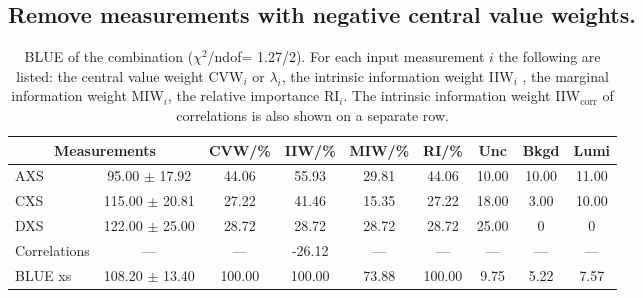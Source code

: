 \subsection{Remove measurements with negative central value weights.}
\begin{table}[H]
\scriptsize
\begin{center}
\renewcommand{\arraystretch}{1.1}
\begin{tabular}{|lc|c|c|c|c|ccc|}
\hline
\multicolumn{2}{|c|}{Measurements} & CVW/\%  & IIW/\%  & MIW/\%  & RI/\%  & {\tiny Unc} & {\tiny Bkgd} & {\tiny Lumi}\\
\hline
AXS &      95.00 $\pm$      17.92 &      44.06 &      55.93 &      29.81 &      44.06 &      10.00 &      10.00 &      11.00\\
CXS &     115.00 $\pm$      20.81 &      27.22 &      41.46 &      15.35 &      27.22 &      18.00 &       3.00 &      10.00\\
DXS &     122.00 $\pm$      25.00 &      28.72 &      28.72 &      28.72 &      28.72 &      25.00 &  0 &  0\\
Correlations & --- & --- &     -26.12 & --- & --- & --- & --- & ---\\
\hline
BLUE {\tiny xs} &     108.20 $\pm$      13.40 &     100.00 &     100.00 &      73.88 &     100.00 &       9.75 &       5.22 &       7.57\\
\hline
\end{tabular}
\caption{BLUE of the combination ($\chi^2$/ndof=      1.27/2).
 For each input measurement $i$ the following are listed: the central value weight CVW$_i$ or $\lambda_i$, the intrinsic information weight IIW$_i$ , the marginal information weight MIW$_i$, the relative importance RI$_i$. The intrinsic information weight IIW$_{\mathrm{corr}}$ of correlations is also shown on a separate row.}
\renewcommand{\arraystretch}{1}
\end{center}
\end{table}
